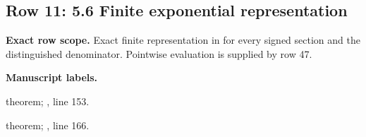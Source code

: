 \subsection{Row 11: 5.6 Finite exponential representation}
\label{row:11}
\textbf{Exact row scope.} Exact finite representation in  for every signed section and the distinguished denominator. Pointwise evaluation is supplied by row 47.\par\smallskip
\textbf{Manuscript labels.} \par\smallskip
{\small{}\par}
{\footnotesize\color{muted}theorem; , line 153.\par}\smallskip
{\small{}\par}
{\footnotesize\color{muted}theorem; , line 166.\par}\smallskip
{}

